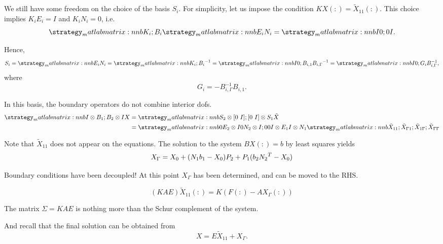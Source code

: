 \begin{frame}{We still have some freedom on the choice of the basis $S_i$.}
For simplicity, let us impose the condition $KX(:)=\tilde{X}_{11}(:)$. This choice implies $K_iE_i=I$ and $K_iN_i=0$, i.e.
\begin{equation*}
\matlabmatrix{K_i; B_i} \matlabmatrix{E_i N_i} = \matlabmatrix{I 0; 0 I}.
\end{equation*}

Hence,
\begin{equation*}
S_i = \matlabmatrix{E_i N_i} = \matlabmatrix{K_i; B_i}^{-1} = \matlabmatrix{I 0; B_{i,1} B_{i,\Gamma}}^{-1} = \matlabmatrix{I 0; G_i B_{i,\Gamma}^{-1}},
\end{equation*}
where
\begin{equation*}
G_i = -B_{i,\Gamma}^{-1}B_{i,1}.
\end{equation*}

\end{frame}


\begin{frame}{In this basis, the boundary operators do not combine interior dofs.}
\begin{align*}
\matlabmatrix{{I\kron B_1}; {B_2\kron I}} X &= \matlabmatrix{{S_2\kron\left[0~I\right]}; {\left[0~I\right]\kron S_1}} \tilde{X}\\
&=\matlabmatrix{{0} {E_2\kron I} {0} {N_2\kron I};
	{0} {0} {I\kron E_1}  {I\kron N_1}} \matlabmatrix{\tilde{X}_{11}; \tilde{X}_{\Gamma 1}; \tilde{X}_{1 \Gamma}; \tilde{X}_{\Gamma\Gamma}}
\end{align*}

Note that $\tilde{X}_{11}$ does not appear on the equations. The solution to the system $BX(:)=b$ by least squares yields
\begin{equation*}
X_\Gamma = X_0 + (N_1 b_1 - X_0)P_2 + P_1 (b_2 {N_2}^{T} - X_0 )
\end{equation*}

\end{frame}

\begin{frame}{Boundary conditions have been decoupled!}
At this point $X_\Gamma$ has been determined, and can be moved to the RHS.

\begin{equation*}
\left(KAE \right) \tilde{X}_{11}(:) = K\left(F(:)-AX_\Gamma(:)\right)
\end{equation*}

The matrix $\Sigma=KAE$ is nothing more than the Schur complement of the system.

\bigskip
And recall that the final solution can be obtained from
\begin{equation*}
X=E\tilde{X}_{11} + X_\Gamma.
\end{equation*}

\end{frame}
